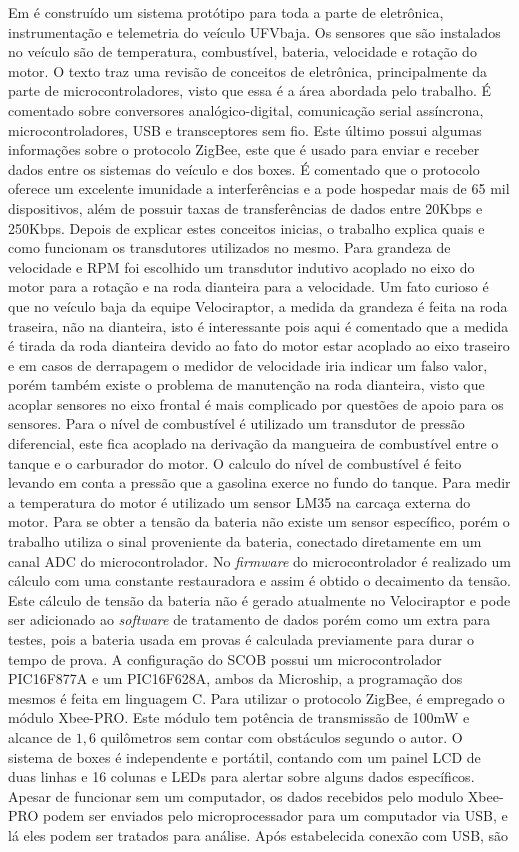 Em  é construído um sistema protótipo para toda a parte de eletrônica, instrumentação e telemetria do veículo UFVbaja. Os sensores que são instalados no veículo são de temperatura, combustível, bateria, velocidade e rotação do motor. O texto traz uma revisão de conceitos de eletrônica, principalmente da parte de microcontroladores, visto que essa é a área abordada pelo trabalho. É comentado sobre conversores analógico-digital, comunicação serial assíncrona, microcontroladores, USB e transceptores sem fio. Este último possui algumas informações sobre o protocolo ZigBee, este que é usado para enviar e receber dados entre os sistemas do veículo e dos boxes. É comentado que o protocolo oferece um excelente imunidade a interferências e a pode hospedar mais de 65 mil dispositivos, além de possuir taxas de transferências de dados entre 20Kbps e 250Kbps. Depois de explicar estes conceitos inicias, o trabalho explica quais e como funcionam os transdutores utilizados no mesmo. Para grandeza de velocidade e RPM foi escolhido um transdutor indutivo acoplado no eixo do motor para a rotação e na roda dianteira para a velocidade. Um fato curioso é que no veículo baja da equipe Velociraptor, a medida da grandeza é feita na roda traseira, não na dianteira, isto é interessante pois aqui é comentado que a medida é tirada da roda dianteira devido ao fato do motor estar acoplado ao eixo traseiro e em casos de derrapagem o medidor de velocidade iria indicar um falso valor, porém também existe o problema de manutenção na roda dianteira, visto que acoplar sensores no eixo frontal é mais complicado por questões de apoio para os sensores. Para o nível de combustível é utilizado um transdutor de pressão diferencial, este fica acoplado na derivação da mangueira de combustível entre o tanque e o carburador do motor. O calculo do nível de combustível é feito levando em conta a pressão que a gasolina exerce no fundo do tanque. Para medir a temperatura do motor é utilizado um sensor LM35 na carcaça externa do motor. Para se obter a tensão da bateria não existe um sensor específico, porém o trabalho utiliza o sinal proveniente da bateria, conectado diretamente em um canal ADC do microcontrolador. No \textit{firmware} do microcontrolador é realizado um cálculo com uma constante restauradora e assim é obtido o decaimento da tensão. Este cálculo de tensão da bateria não é gerado atualmente no Velociraptor e pode ser adicionado ao \textit{software} de tratamento de dados porém como um extra para testes, pois a bateria usada em provas é calculada previamente para durar o tempo de prova. A configuração do SCOB possui um microcontrolador PIC16F877A e um PIC16F628A, ambos da Microship, a programação dos mesmos é feita em linguagem C. Para utilizar o protocolo ZigBee, é empregado o módulo Xbee-PRO. Este módulo tem potência de transmissão de 100mW e alcance de $1,6$ quilômetros sem contar com obstáculos segundo o autor. O sistema de boxes é independente e portátil, contando com um painel LCD de duas linhas e 16 colunas e LEDs para alertar sobre alguns dados específicos. Apesar de funcionar sem um computador, os dados recebidos pelo modulo Xbee-PRO podem ser enviados pelo microprocessador para um computador via USB, e lá eles podem ser tratados para análise. Após estabelecida conexão com USB, são 